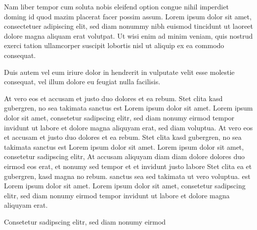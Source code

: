 \documentclass[]{../metanetpaper}
\begin{document}
Nam liber tempor cum soluta nobis eleifend option congue nihil imperdiet doming id quod mazim placerat facer possim assum. Lorem ipsum dolor sit amet, consectetuer adipiscing elit, sed diam nonummy nibh euismod tincidunt ut laoreet dolore magna aliquam erat volutpat. Ut wisi enim ad minim veniam, quis nostrud exerci tation ullamcorper suscipit lobortis nisl ut aliquip ex ea commodo consequat.   

Duis autem vel eum iriure dolor in hendrerit in vulputate velit esse molestie consequat, vel illum dolore eu feugiat nulla facilisis.   

At vero eos et accusam et justo duo dolores et ea rebum. Stet clita kasd gubergren, no sea takimata sanctus est Lorem ipsum dolor sit amet. Lorem ipsum dolor sit amet, consetetur sadipscing elitr, sed diam nonumy eirmod tempor invidunt ut labore et dolore magna aliquyam erat, sed diam voluptua. At vero eos et accusam et justo duo dolores et ea rebum. Stet clita kasd gubergren, no sea takimata sanctus est Lorem ipsum dolor sit amet. Lorem ipsum dolor sit amet, consetetur sadipscing elitr, At accusam aliquyam diam diam dolore dolores duo eirmod eos erat, et nonumy sed tempor et et invidunt justo labore Stet clita ea et gubergren, kasd magna no rebum. sanctus sea sed takimata ut vero voluptua. est Lorem ipsum dolor sit amet. Lorem ipsum dolor sit amet, consetetur sadipscing elitr, sed diam nonumy eirmod tempor invidunt ut labore et dolore magna aliquyam erat.   

Consetetur sadipscing elitr, sed diam nonumy eirmod
\end{document}
